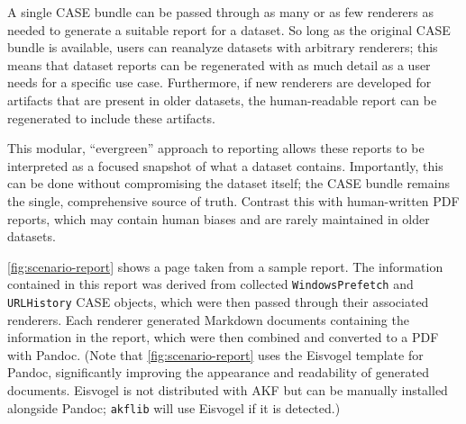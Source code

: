 \documentclass[letterpaper,12pt]{report}
\newcommand{\passthrough}[1]{#1}
\begin{document}
A single CASE bundle can be passed through as many or as few renderers
as needed to generate a suitable report for a dataset. So long as the
original CASE bundle is available, users can reanalyze datasets with
arbitrary renderers; this means that dataset reports can be regenerated
with as much detail as a user needs for a specific use case.
Furthermore, if new renderers are developed for artifacts that are
present in older datasets, the human-readable report can be regenerated
to include these artifacts.

This modular, ``evergreen'' approach to reporting allows these reports
to be interpreted as a focused snapshot of what a dataset contains.
Importantly, this can be done without compromising the dataset itself;
the CASE bundle remains the single, comprehensive source of truth.
Contrast this with human-written PDF reports, which may contain human
biases and are rarely maintained in older datasets.

\autoref{fig:scenario-report} shows a page taken from a sample report.
The information contained in this report was derived from collected
\passthrough{\lstinline!WindowsPrefetch!} and
\passthrough{\lstinline!URLHistory!} CASE objects, which were then
passed through their associated renderers. Each renderer generated
Markdown documents containing the information in the report, which were
then combined and converted to a PDF with Pandoc. (Note that
\autoref{fig:scenario-report} uses the Eisvogel template
\cite{waglerWandmalfarbePandoclatextemplate2025} for Pandoc,
significantly improving the appearance and readability of generated
documents. Eisvogel is not distributed with AKF but can be manually
installed alongside Pandoc; \passthrough{\lstinline!akflib!} will use
Eisvogel if it is detected.)
\end{document}
